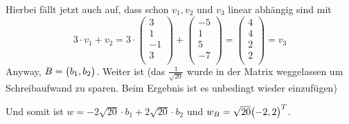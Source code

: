 \documentclass{scrreprt}
\begin{document}
Hierbei fällt jetzt auch auf, dass schon $v_1, v_2$ und $v_3$ linear abhängig
sind mit
\[
  3 \cdot v_1 + v_2 = 3 \cdot \begin{pmatrix}
    3  \\
    1  \\
    -1 \\
    3  \\
  \end{pmatrix} + \begin{pmatrix}
    -5 \\
    1  \\
    5  \\
    -7 \\
  \end{pmatrix} = \begin{pmatrix}
    4 \\
    4 \\
    2 \\
    2 \\
  \end{pmatrix} = v_3
\]
Anyway, $B = \qty\big(b_1, b_2)$.
Weiter ist (das $\frac{1}{\sqrt{20}}$ wurde in der Matrix weggelassen um
Schreibaufwand zu sparen.
Beim Ergebnis ist es unbedingt wieder einzufügen)
Und somit ist $w = -2\sqrt{20} \cdot b_1 + 2\sqrt{20} \cdot b_2$ und
$w_B = \sqrt{20}\qty\big(-2, 2)^T$.
\end{document}
